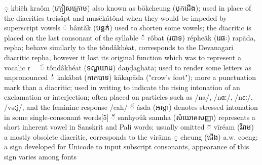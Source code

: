 ុ	kbiĕh kraôm (ក្បៀសក្រោម)	also known as bŏkcheung (បុកជើង); used in place of the diacritics treisâpt and musĕkâtônd when they would be impeded by superscript vowels
់	bântăk (បន្តក់)	used to shorten some vowels; the diacritic is placed on the last consonant of the syllable
៌	rôbat (របាទ)
répheăk (រេផៈ)	rapāda, repha; behave similarly to the tôndâkhéat, corresponds to the Devanagari diacritic repha, however it lost its original function which was to represent a vocalic r
　៍	tôndâkhéat (ទណ្ឌឃាដ)	daṇḍaghāta; used to render some letters as unpronounced
៎	kakâbat (កាកបាទ)	kākapāda ("crow's foot"); more a punctuation mark than a diacritic; used in writing to indicate the rising intonation of an exclamation or interjection; often placed on particles such as /na/, /nɑː/, /nɛː/, /vəːj/, and the feminine response /cah/
៏	âsda (អស្តា)	denotes stressed intonation in some single-consonant words[5]
័	sanhyoŭk sannha (សំយោគសញ្ញា)	represents a short inherent vowel in Sanskrit and Pali words; usually omitted
៑	vĭréam (វិរាម)	a mostly obsolete diacritic, corresponds to the virāma
្	cheung (ជើង)	a.w. coeng; a sign developed for Unicode to input subscript consonants, appearance of this sign varies among fonts